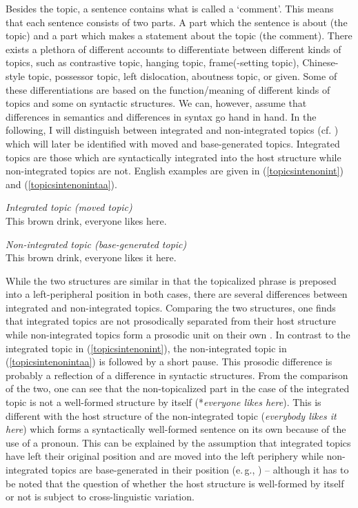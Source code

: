 \noindent Besides the topic, a sentence contains what is called a `comment'. This means that each sentence consists of two parts. A part which the sentence is about (the topic) and a part which makes a statement about the topic (the comment). There exists a plethora of different accounts to differentiate between different kinds of topics, such as contrastive topic, hanging topic, frame(-setting topic), Chinese-style topic, possessor topic, left dislocation, aboutness topic, or given. Some of these differentiations are based on the function/meaning of different kinds of topics and some on syntactic structures. We can, however, assume that differences in semantics and differences in syntax go hand in hand. In the following, I will distinguish between integrated and non-integrated topics (cf. \citealt{shaer2004integrated}) which will later be identified with moved and base-generated topics. Integrated topics are those which are syntactically integrated into the host structure while non-integrated topics are not. English examples are given in (\ref{topicsintenonint}) and (\ref{topicsintenonintaa}).

\begin{exe}
\ex \textit{Integrated topic (moved topic)}\\
This brown drink, everyone likes here.   \label{topicsintenonint}
\end{exe}

\begin{exe}
\ex \textit{Non-integrated topic (base-generated topic)}\\
This brown drink, everyone likes it here. \label{topicsintenonintaa}
\end{exe}

\noindent While the two structures are similar in that the topicalized phrase is preposed into a left-peripheral position in both cases, there are several differences between integrated and non-integrated topics. Comparing the two structures, one finds that integrated topics are not prosodically separated from their host structure while non-integrated topics form a prosodic unit on their own \citep{shaer2004integrated}. In contrast to the integrated topic in (\ref{topicsintenonint}), the non-integrated topic in (\ref{topicsintenonintaa}) is followed by a short pause. This prosodic difference is probably a reflection of a difference in syntactic structures. From the comparison of the two, one can see that the non-topicalized part in the case of the integrated topic is not a well-formed structure by itself (*\textit{everyone likes here}). This is different with the host structure of the non-integrated topic (\textit{everybody likes it here}) which forms a syntactically well-formed sentence on its own because of the use of a pronoun. This can be explained by the assumption that integrated topics have left their original position and are moved into the left periphery while non-integrated topics are base-generated in their position (e.\,g., \citealt{rodman1974left, vat1981left, grohmann2003prolific}) -- although it has to be noted that the question of whether the host structure is well-formed by itself or not is subject to cross-linguistic variation.

